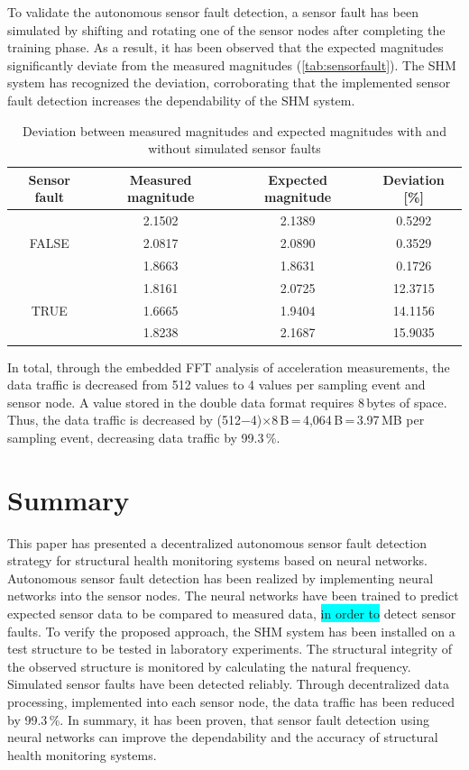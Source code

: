 \documentclass[12pt,a4paper]{scrartcl}
\begin{document}
To validate the autonomous sensor fault detection, a sensor fault has been simulated by shifting and rotating one of the sensor nodes after completing the training phase.
As a result, it has been observed that the expected magnitudes significantly deviate from the measured magnitudes (\autoref{tab:sensorfault}).
The SHM system has recognized the deviation, corroborating that the implemented sensor fault detection increases the dependability of the SHM system.

\begin{table}[hb]
	\centering
	\caption{Deviation between measured magnitudes and expected magnitudes with and without simulated sensor faults}
	\begin{tabular}{c c c c}
		\toprule
		Sensor fault & Measured magnitude & Expected magnitude & Deviation [\%]\\ 
		\midrule
		  & 2.1502 & 2.1389 & 0.5292 \\
		FALSE & 2.0817 & 2.0890 & 0.3529 \\
		  & 1.8663 & 1.8631 & 0.1726 \\
		\midrule	
		 & 1.8161 & 2.0725 & 12.3715\\
		TRUE & 1.6665 & 1.9404 & 14.1156\\
		 & 1.8238 & 2.1687 & 15.9035\\
		\bottomrule
	\end{tabular}
	\label{tab:sensorfault}
\end{table}

In total, through the embedded FFT analysis of acceleration measurements, the data traffic is decreased from 512 values to 4 values per sampling event and sensor node.
A value stored in the double data format requires 8\,bytes of space.
Thus, the data traffic is decreased by (512$-$4)$\times$8\,B\,=\,4,064\,B\,=\,3.97\,MB per sampling event, decreasing data traffic by 99.3\,\%.


\section*{Summary}

This paper has presented a decentralized autonomous sensor fault detection strategy for structural health monitoring systems based on neural networks. 
Autonomous sensor fault detection has been realized by implementing neural networks into the sensor nodes.
The neural networks have been trained to predict expected sensor data to be compared to measured data, \colorbox{cyan}{in order to} detect sensor faults.
To verify the proposed approach, the SHM system has been installed on a test structure to be tested in laboratory experiments.
The structural integrity of the observed structure is monitored by calculating the natural frequency.
Simulated sensor faults have been detected reliably.
Through decentralized data processing, implemented into each sensor node, the data traffic has been reduced by 99.3\,\%.
In summary, it has been proven, that sensor fault detection using neural networks can improve the dependability and the accuracy of structural health monitoring systems.





\end{document}
